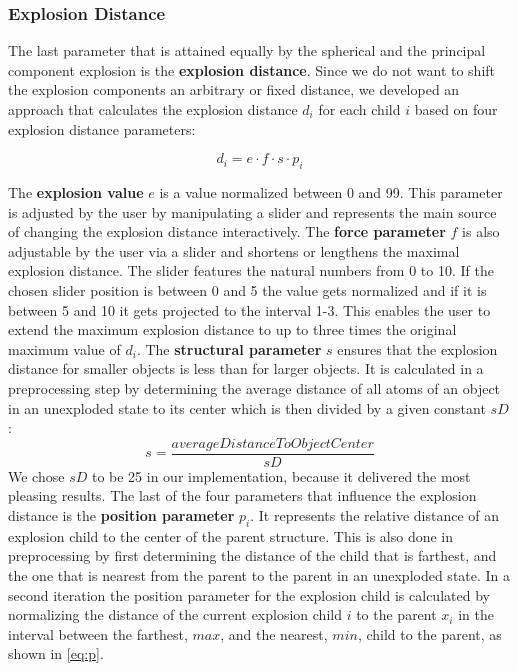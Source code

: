 \documentclass[draft,final]{vutinfth} %
\begin{document}
\subsubsection{Explosion Distance}
\label{subsubsec:expldistStruc}
The last parameter that is attained equally by the spherical and the principal component explosion is the \textbf{explosion distance}. 
Since we do not want to shift the explosion components an arbitrary or fixed distance, we developed an approach that calculates the explosion distance $d_i$ for each child $i$ based on four explosion distance parameters:

\begin{equation}
\label{eq:d}
d_i = e \cdot f \cdot s \cdot p_i
\end{equation}

The \textbf{explosion value} \(e\) is a value normalized between 0 and 99. 
This parameter is adjusted by the user by manipulating a slider and represents the main source of changing the explosion distance interactively. 
The \textbf{force parameter} \(f\) is also adjustable by the user via a slider and shortens or lengthens the maximal explosion distance. 
The slider features the natural numbers from 0 to 10. 
If the chosen slider position is between 0 and 5 the value gets normalized and if it is between 5 and 10 it gets projected to the interval 1-3. 
This enables the user to extend the maximum explosion distance to up to three times the original maximum value of \(d_i\). 
The \textbf{structural parameter} \(s\) ensures that the explosion distance for smaller objects is less than for larger objects. 
It is calculated in a preprocessing step by determining the average distance of all atoms of an object in an unexploded state to its center which is then divided by a given constant \(sD\):
\begin{equation}
\label{eq:s}
s = \frac{averageDistanceToObjectCenter}{sD}
\end{equation}
We chose \(sD\) to be 25 in our implementation, because it delivered the most pleasing results.
The last of the four parameters that influence the explosion distance is the \textbf{position parameter} \(p_i\). 
It represents the relative distance of an explosion child to the center of the parent structure. 
This is also done in preprocessing by first determining the distance of the child that is farthest, and the one that is nearest from the parent to the parent in an unexploded state. 
In a second iteration the position parameter for the explosion child is calculated by normalizing the distance of the current explosion child $i$ to the parent \(x_i\) in the interval between the farthest, \(max\), and the nearest, \(min\), child to the parent, as shown in \autoref{eq:p}.
\end{document}
